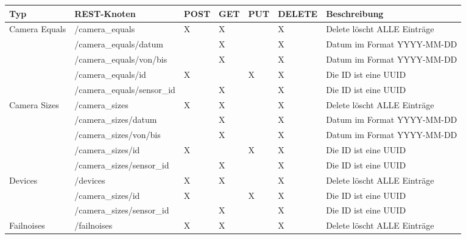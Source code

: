 \begin{landscape}
  \begin{table}[H]
    \begin{longtable}{lllllll}
      \textbf{Typ} & \textbf{REST-Knoten} & \textbf{POST} & \textbf{GET} & \textbf{PUT} & \textbf{DELETE} & \textbf{Beschreibung} \\ \toprule
      \multirow{5}{*}{Camera Equals}  & /camera\_equals               & X & X & & X & Delete löscht ALLE Einträge   \\
                                      & /camera\_equals/{datum}       &  & X & & X & Datum im Format YYYY-MM-DD     \\
                                      & /camera\_equals/{von}/{bis}   &  & X & & X & Datum im Format YYYY-MM-DD     \\
                                      & /camera\_equals/{id}          & X & & X & X & Die ID ist eine UUID          \\
                                      & /camera\_equals/{sensor\_id}  &  & X & & X & Die ID ist eine UUID           \\ \midrule
      \multirow{5}{*}{Camera Sizes}   & /camera\_sizes                & X & X & & X & Delete löscht ALLE Einträge   \\
                                      & /camera\_sizes/{datum}        &  & X & & X & Datum im Format YYYY-MM-DD     \\
                                      & /camera\_sizes/{von}/{bis}    &  & X & & X & Datum im Format YYYY-MM-DD     \\
                                      & /camera\_sizes/{id}           & X & & X & X & Die ID ist eine UUID          \\
                                      & /camera\_sizes/{sensor\_id}   &  & X & & X & Die ID ist eine UUID           \\ \midrule
      \multirow{3}{*}{Devices}        & /devices                      & X & X & & X & Delete löscht ALLE Einträge   \\
                                      & /camera\_sizes/{id}           & X & & X & X & Die ID ist eine UUID          \\
                                      & /camera\_sizes/{sensor\_id}   &  & X & & X & Die ID ist eine UUID           \\ \midrule
      \multirow{5}{*}{Failnoises}     & /failnoises                   & X & X & & X & Delete löscht ALLE Einträge   \\

\end{longtable}
\end{table}
\end{landscape}
